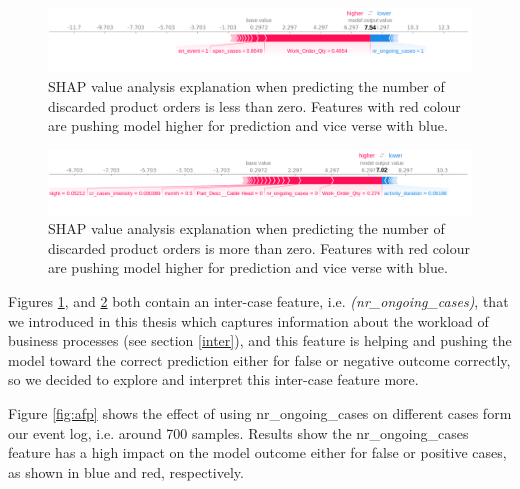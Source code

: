 \begin{figure}[!htbp]
	\includegraphics[width=\linewidth]{images/shap/false_force_plot_sc.png}
	\caption[SHAP force plot product (false outcome)]{SHAP value analysis explanation when predicting the number of discarded product orders is less than zero. Features with red colour are pushing model higher for prediction and vice verse with blue.}
	\label{fig:ffp}
\end{figure}\hspace*{\fill}

\begin{figure}[!htbp]
	\includegraphics[width=\linewidth]{images/shap/true_fp.png}
	\caption[SHAP force plot product (true outcome)]{SHAP value analysis explanation when predicting the number of discarded product orders is more than zero. Features with red colour are pushing model higher for prediction and vice verse with blue.}
	\label{fig:tfp}
\end{figure}\hspace*{\fill}

Figures \ref{fig:ffp}, and \ref{fig:tfp} both contain an inter-case feature, i.e. \textit{(nr\_ongoing\_cases)},  that we introduced in this thesis which captures information about the workload of business processes (see section \ref{inter}), and this feature is helping and pushing the model toward the correct prediction either for false or negative outcome correctly, so we decided to explore and interpret this inter-case feature more. 

Figure \ref{fig:afp} shows the effect of using nr\_ongoing\_cases on different cases form our event log, i.e. around 700 samples. Results show the nr\_ongoing\_cases feature has a high impact on the model outcome either for false or positive cases, as shown in blue and red, respectively. 

